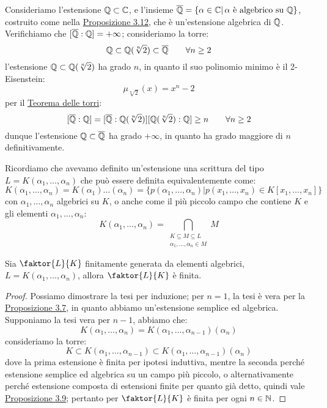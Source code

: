 \documentclass[11pt]{scrartcl}
\begin{document}
\begin{example}
    Consideriamo l'estensione $\mathbb Q \subset \mathbb C$, e l'insieme $\overline{\mathbb Q} = \{\alpha \in \mathbb C | \, \text{$\alpha$ è algebrico su $\mathbb Q$}\}$, costruito come nella \hyperref[3.12]{Proposizione 3.12},
    che è un'estensione algebrica di $\mathbb Q$. Verifichiamo che $[\overline{\mathbb Q}:\mathbb Q] = +\infty$; consideriamo la torre:
    \[ \mathbb Q \subset \mathbb Q(\sqrt[n]{2}) \subset \overline {\mathbb Q} \qquad \forall n \geq 2
        \]
    l'estensione $\mathbb Q \subset \mathbb Q(\sqrt[n]{2})$ ha grado $n$, in quanto il suo polinomio minimo è il 2-Eisenstein:
    \[ \mu_{\sqrt[n]{2}}(x) = x^n - 2
        \]
    per il \hyperref[torri]{Teorema delle torri}:
    \[ [\overline {\mathbb Q}: \mathbb Q] = [\overline {\mathbb Q}: \mathbb Q(\sqrt[n]{2})] [\mathbb Q(\sqrt[n]{2}) : \mathbb Q] \geq n \qquad \forall n \geq 2
        \]
    dunque l'estensione $\mathbb Q \subset \overline{\mathbb Q}$ ha grado $+\infty$, in quanto ha grado maggiore di $n$ definitivamente.
\end{example}

\begin{remark}
    Ricordiamo che avevamo definito un'estensione  una scrittura del tipo $L = K(\alpha_1,\ldots,\alpha_n)$ che può essere definita equivalentemente come:
    \[ K(\alpha_1,\ldots,\alpha_n) = K(\alpha_1)\ldots(\alpha_n) = \{p(\alpha_1,\ldots,\alpha_n) | p(x_1,\ldots,x_n) \in K[x_1,\ldots,x_n] \}
        \]
    con $\alpha_1,\ldots,\alpha_n$ algebrici su $K$, o anche come il più piccolo campo che contiene $K$ e gli elementi $\alpha_1,\ldots,\alpha_n$:
    \[ K(\alpha_1,\ldots,\alpha_n) = \bigcap_{\substack{K \subseteq M \subseteq L \\ \alpha_1,\ldots,\alpha_n \in M}}M
        \]
\end{remark}

\begin{proposition}
    \label{3.16}
    Sia $\faktor{L}{K}$ finitamente generata da elementi algebrici, $L = K(\alpha_1,\ldots,\alpha_n)$, allora $\faktor{L}{K}$ è finita.
\end{proposition}

\begin{proof}
    Possiamo dimostrare la tesi per induzione; per $n = 1$, la tesi è vera per la \hyperref[3.7]{Proposizione 3.7}, in quanto abbiamo un'estensione semplice ed algebrica. Supponiamo la tesi vera per $n-1$, abbiamo che:
    \[ K(\alpha_1,\ldots,\alpha_n) = K(\alpha_1,\ldots,\alpha_{n-1})(\alpha_n)
        \]
    consideriamo la torre:
    \[ K \subset K(\alpha_1,\ldots,\alpha_{n-1}) \subset K(\alpha_1,\ldots,\alpha_{n-1})(\alpha_n)
        \]
    dove la prima estensione è finita per ipotesi induttiva, mentre la seconda perché estensione semplice ed algebrica su un campo più piccolo, o alternativamente perché estensione composta di estensioni finite per quanto già detto, 
    quindi vale \hyperref[3.9]{Proposizione 3.9}; pertanto per $\faktor{L}{K}$ è finita per ogni $n \in \mathbb N$.
\end{proof}
\end{document}
